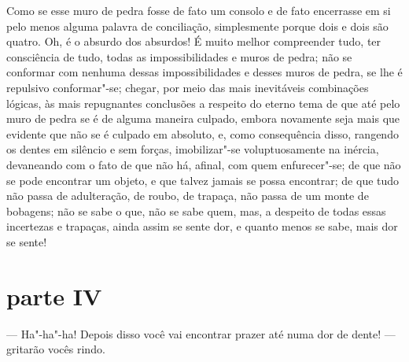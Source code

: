 Como se esse muro de pedra fosse de fato um consolo e de fato encerrasse
em si pelo menos alguma palavra de conciliação, simplesmente porque
dois e dois são quatro. Oh, é o absurdo dos absurdos! É muito melhor
compreender tudo, ter consciência de tudo, todas as impossibilidades e
muros de pedra; não se conformar com nenhuma dessas impossibilidades e
desses muros de pedra, se lhe é repulsivo conformar"-se; chegar, por
meio das mais inevitáveis combinações lógicas, às mais repugnantes
conclusões a respeito do eterno tema de que até pelo muro de pedra se é
de alguma maneira culpado, embora novamente seja mais que evidente que
não se é culpado em absoluto, e, como consequência disso, rangendo os
dentes em silêncio e sem forças, imobilizar"-se voluptuosamente na
inércia, devaneando com o fato de que não há, afinal, com quem
enfurecer"-se; de que não se pode encontrar um objeto, e que talvez
jamais se possa encontrar; de que tudo não passa de adulteração, de
roubo, de trapaça, não passa de um monte de bobagens; não se sabe o
que, não se sabe quem, mas, a despeito de todas essas incertezas e
trapaças, ainda assim se sente dor, e quanto menos se sabe, mais dor se
sente!


\section{parte IV}

--- Ha"-ha"-ha! Depois disso você vai encontrar prazer até numa dor de
dente! --- gritarão vocês rindo.

